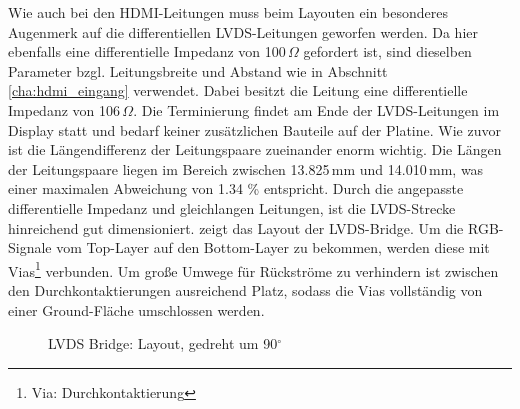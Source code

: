 Wie auch bei den HDMI-Leitungen muss beim Layouten ein besonderes Augenmerk auf die differentiellen LVDS-Leitungen geworfen werden. Da hier ebenfalls eine differentielle Impedanz von 100\,$\Omega$ gefordert ist, sind dieselben Parameter bzgl. Leitungsbreite und Abstand wie in Abschnitt \ref{cha:hdmi_eingang} verwendet. Dabei besitzt die Leitung eine differentielle Impedanz von 106\,$\Omega$.  Die Terminierung findet am Ende der LVDS-Leitungen im Display statt und bedarf keiner zusätzlichen Bauteile auf der Platine. Wie zuvor ist die Längendifferenz der Leitungspaare zueinander enorm wichtig. Die Längen der Leitungspaare liegen im Bereich zwischen 13.825\,mm und 14.010\,mm, was einer maximalen Abweichung von 1.34 \% entspricht. Durch die angepasste differentielle Impedanz und gleichlangen Leitungen, ist die LVDS-Strecke hinreichend gut dimensioniert.  zeigt das Layout der LVDS-Bridge. Um die RGB-Signale vom Top-Layer auf den Bottom-Layer zu bekommen, werden diese mit Vias\footnote{Via: Durchkontaktierung} verbunden. Um große Umwege für Rückströme zu verhindern ist zwischen den Durchkontaktierungen ausreichend Platz, sodass die Vias vollständig von einer Ground-Fläche umschlossen werden.
\begin{figure}[htp]
		\center
        \caption{LVDS Bridge: Layout, gedreht um 90$^{\circ}$}
       \label{fig:teilb_lvds_bridge_pcb}
\end{figure}
\newpage
